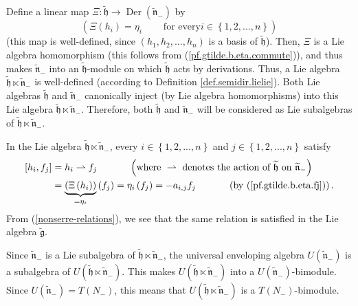 \documentclass[etingof-lie.tex]{subfiles}
\begin{document}
Define a linear map $\Xi:\widetilde{\mathfrak{h}}\rightarrow
\operatorname*{Der}\left(  \widetilde{\mathfrak{n}}_{-}\right)  $ by%
\[
\left(  \Xi\left(  h_{i}\right)  =\eta_{i}\ \ \ \ \ \ \ \ \ \ \text{for every
}i\in\left\{  1,2,...,n\right\}  \right)
\]
(this map is well-defined, since $\left(  h_{1},h_{2},...,h_{n}\right)  $ is a
basis of $\widetilde{\mathfrak{h}}$). Then, $\Xi$ is a Lie algebra
homomorphism (this follows from (\ref{pf.gtilde.b.eta.commute})), and thus
makes $\widetilde{\mathfrak{n}}_{-}$ into an $\widetilde{\mathfrak{h}}$-module
on which $\widetilde{\mathfrak{h}}$ acts by derivations. Thus, a Lie algebra
$\widetilde{\mathfrak{h}}\ltimes\widetilde{\mathfrak{n}}_{-}$ is well-defined
(according to Definition \ref{def.semidir.lielie}). Both Lie algebras
$\widetilde{\mathfrak{h}}$ and $\widetilde{\mathfrak{n}}_{-}$ canonically
inject (by Lie algebra homomorphisms) into this Lie algebra
$\widetilde{\mathfrak{h}}\ltimes\widetilde{\mathfrak{n}}_{-}$. Therefore, both
$\widetilde{\mathfrak{h}}$ and $\widetilde{\mathfrak{n}}_{-}$ will be
considered as Lie subalgebras of $\widetilde{\mathfrak{h}}\ltimes
\widetilde{\mathfrak{n}}_{-}$.

In the Lie algebra $\widetilde{\mathfrak{h}}\ltimes\widetilde{\mathfrak{n}%
}_{-}$, every $i\in\left\{  1,2,...,n\right\}  $ and $j\in\left\{
1,2,...,n\right\}  $ satisfy%
\begin{align}
\left[  h_{i},f_{j}\right]   &  =h_{i}\rightharpoonup f_{j}%
\ \ \ \ \ \ \ \ \ \ \left(  \text{where }\rightharpoonup\text{ denotes the
action of }\widetilde{\mathfrak{h}}\text{ on }\widetilde{\mathfrak{n}}%
_{-}\right) \nonumber\\
&  =\underbrace{\left(  \Xi\left(  h_{i}\right)  \right)  }_{=\eta_{i}}\left(
f_{j}\right)  =\eta_{i}\left(  f_{j}\right)  =-a_{i,j}f_{j}%
\ \ \ \ \ \ \ \ \ \ \left(  \text{by (\ref{pf.gtilde.b.eta.fj})}\right)  .
\label{pf.gtilde.b.semidir.ij}%
\end{align}
From (\ref{nonserre-relations}), we see that the same relation is satisfied in
the Lie algebra $\widetilde{\mathfrak{g}}$.

Since $\widetilde{\mathfrak{n}}_{-}$ is a Lie subalgebra of
$\widetilde{\mathfrak{h}}\ltimes\widetilde{\mathfrak{n}}_{-}$, the universal
enveloping algebra $U\left(  \widetilde{\mathfrak{n}}_{-}\right)  $ is a
subalgebra of $U\left(  \widetilde{\mathfrak{h}}\ltimes\widetilde{\mathfrak{n}%
}_{-}\right)  $. This makes $U\left(  \widetilde{\mathfrak{h}}\ltimes
\widetilde{\mathfrak{n}}_{-}\right)  $ into a $U\left(
\widetilde{\mathfrak{n}}_{-}\right)  $-bimodule. Since $U\left(
\widetilde{\mathfrak{n}}_{-}\right)  =T\left(  N_{-}\right)  $, this means
that $U\left(  \widetilde{\mathfrak{h}}\ltimes\widetilde{\mathfrak{n}}%
_{-}\right)  $ is a $T\left(  N_{-}\right)  $-bimodule.
\end{document}

